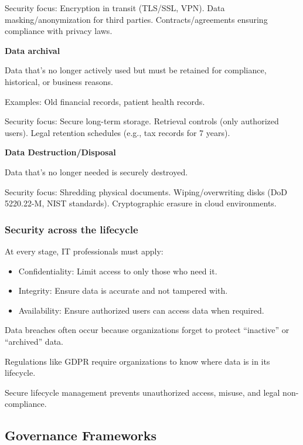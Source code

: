 Security focus: Encryption in transit (TLS/SSL, VPN). Data masking/anonymization for third parties. Contracts/agreements ensuring compliance with privacy laws.

\bigskip

\noindent\textbf{Data archival}

Data that’s no longer actively used but must be retained for compliance, historical, or business reasons.

Examples: Old financial records, patient health records.

Security focus: Secure long-term storage. Retrieval controls (only authorized users). Legal retention schedules (e.g., tax records for 7 years).

\noindent\textbf{Data Destruction/Disposal}

Data that’s no longer needed is securely destroyed.

Security focus: Shredding physical documents. Wiping/overwriting disks (DoD 5220.22-M, NIST standards). Cryptographic erasure in cloud environments.

\subsubsection{Security across the lifecycle}

\indent

At every stage, IT professionals must apply:

\begin{itemize}
    \item Confidentiality: Limit access to only those who need it.
    \item Integrity: Ensure data is accurate and not tampered with.
    \item Availability: Ensure authorized users can access data when required.
\end{itemize}

Data breaches often occur because organizations forget to protect “inactive” or “archived” data.

Regulations like GDPR require organizations to know where data is in its lifecycle.

Secure lifecycle management prevents unauthorized access, misuse, and legal non-compliance.

\subsection{Governance Frameworks}

